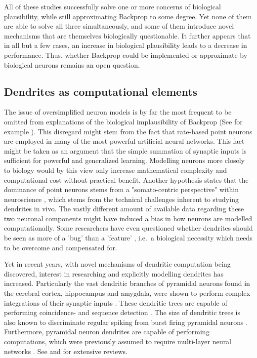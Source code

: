 \noindent All of these studies successfully solve one or more concerns of biological plausibility, while still
approximating Backprop to some degree. Yet none of them are able to solve all three simultaneously, and some of them
introduce novel mechanisms that are themselves biologically questionable. It further appears that in all but a few
cases, an increase in biological plausibility leads to a decrease in performance. Thus, whether Backprop could be
implemented or approximate by biological neurons remains an open question.

\subsection{Dendrites as computational elements}\label{sec-dendrites}

The issue of oversimplified neuron models is by far the most frequent to be omitted from explanations of the biological
implausibility of Backprop (See for example \citep{Meulemans2020,Lillicrap2014}). This disregard might stem from the
fact that rate-based point neurons are employed in many of the most powerful artificial neural networks. This fact might
be taken as an argument that the simple summation of synaptic inputs is sufficient for powerful and generalized
learning. Modelling neurons more closely to biology would by this view only increase mathematical complexity and
computational cost without practical benefit. Another hypothesis states that the dominance of point neurons stems from a
"somato-centric perspective" within neuroscience \citep{Larkum2018}, which stems from the technical challenges inherent
to studying dendrites in vivo. The vastly different amount of available data regarding these two neuronal components
might have induced a bias in how neurons are modelled computationally. Some researchers have even questioned whether
dendrites should be seen as more of a 'bug' than a 'feature' \citep{Haeusser2003}, i.e.\ a biological necessity which
needs to be overcome and compensated for.

Yet in recent years, with novel mechanisms of dendritic computation being discovered, interest in researching and
explicitly modelling dendrites has increased. Particularly the vast dendritic branches of pyramidal neurons found in the
cerebral cortex, hippocampus and amygdala, were shown to perform complex integrations of their synaptic inputs
\citep{spruston2008pyramidal}. These dendritic trees are capable of performing coincidence- \citep{Larkum1999} and
sequence detection \citep{Branco2010}. The size of dendritic trees is also known to discriminate regular spiking from
burst firing pyramidal neurons \citep{Elburg2010}. Furthermore, pyramidal neuron dendrites are capable of performing
computations, which were previously assumed to require multi-layer neural networks \citep{Schiess2016,Gidon2020}. See
\citep{Larkum2022} and \citep{Poirazi2020} for extensive reviews. 

